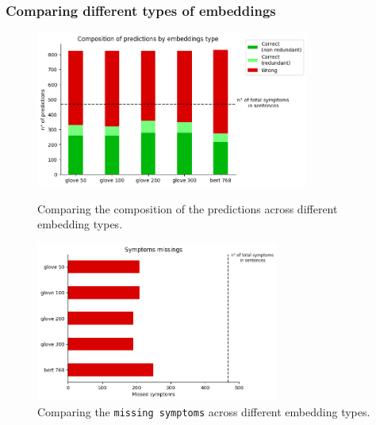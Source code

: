\subsubsection{Comparing different types of embeddings}

\begin{figure}[h]%
  \centering
  \begin{minipage}[b]{0.4\textwidth}
    \includegraphics[width=9cm]{graphs/comparison_embeddings_type}
    \caption{Comparing the composition of the predictions across different embedding types.}
  \end{minipage}
  \hfill
  \begin{minipage}[b]{0.4\textwidth}
    \includegraphics[width=8cm]{graphs/comparison_embeddings_type_missings}
    \caption{Comparing the \texttt{missing symptoms} across different embedding types.}
  \end{minipage}
\end{figure}

